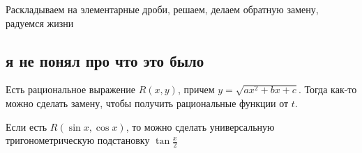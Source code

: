 Раскладываем на элементарные дроби, решаем, делаем обратную замену, радуемся жизни

\subsection{я не понял про что это было}

Есть рациональное выражение \( R(x, y) \), причем \( y = \sqrt{ax^2 + bx + c} \).
Тогда как-то можно сделать замену, чтобы получить рациональные функции от \( t \).

Если есть \( R(\sin x, \cos x) \), то можно сделать универсальную тригонометрическую подстановку \( \tan \frac{x}{2} \)
